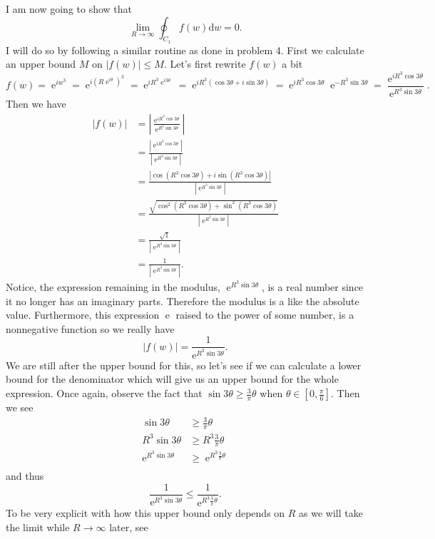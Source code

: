 \documentclass[10pt]{amsart}
\newcommand{\D}{\mathrm{d}}
\DeclareMathOperator{\E}{e}
\theoremstyle{nonumberplain}
\begin{document}
\begin{enumerate}[label={\bf {\arabic*}:}]
\noindent
I am now going to show that $$\lim_{R \rightarrow \infty} \oint_{C_{1}} f(w) \D w = 0.$$
I will do so by following a similar routine as done in problem 4.
First we calculate an upper bound $M$ on $\left| f(w) \right| \leq M$.
Let's first rewrite $f(w)$ a bit
$$
f(w) = \E^{iw^3} = \E^{i\left(R\E^{i\theta} \right)^3} = \E^{iR^3\E^{i3\theta}} = \E^{iR^3\left( \cos3\theta +  i\sin3\theta \right)} = \E^{iR^3\cos3\theta}\E^{ -R^3\sin3\theta} = \frac{\E^{iR^3\cos3\theta}}{\E^{R^3\sin3\theta}}.
$$
Then we have
\begin{align*}
\left|f(w)\right|
	&= \left| \frac{\E^{iR^3\cos3\theta}}{\E^{ R^3\sin3\theta}} \right| \\
	&= \frac{\left| \E^{iR^3\cos3\theta}\right| }{\left| \E^{ R^3\sin3\theta}\right| } \\
	&= \frac{\left| \cos\left(R^3\cos3\theta\right) + i\sin\left(R^3\cos3\theta\right)\right| }{\left| \E^{ R^3\sin3\theta}\right| } \\
	&= \frac{\sqrt{\cos^2\left(R^3\cos3\theta\right) + \sin^2\left(R^3\cos3\theta\right)} }{\left| \E^{ R^3\sin3\theta}\right| } \\
	&= \frac{\sqrt{1} }{\left| \E^{ R^3\sin3\theta}\right| } \\
	&= \frac{1}{\left| \E^{ R^3\sin3\theta}\right| }.
\end{align*}
Notice, the expression remaining in the modulus, $\E^{ R^3\sin3\theta}$, is a real number  since it no longer has an imaginary parts. Therefore the modulus is a like the absolute value.
Furthermore, this expression $\E$ raised to the power of some number, is a nonnegative function so we really have
$$
\left|f(w)\right| = \frac{1}{\E^{ R^3\sin3\theta}}.
$$
We are still after the upper bound for this, so let's see if we can calculate a lower bound for the denominator which will give us an upper bound for the whole expression.
Once again, observe the fact that
$\sin 3\theta \geq \frac 3 \pi \theta$ when $\theta \in [0, \frac \pi 6]$.
Then we see
\begin{align*}
\sin 3\theta &\geq \frac 3 \pi \theta \\
R^3\sin 3\theta &\geq R^3\frac 3 \pi \theta \\
\E^{R^3\sin 3\theta} &\geq \E^{R^3\frac 3 \pi \theta} \\
\end{align*}
and thus
$$
\frac 1 {\E^{R^3\sin 3\theta}} \leq \frac 1 {\E^{R^3\frac 3 \pi \theta}}.
$$
To be very explicit with how this upper bound only depends on $R$ as we will take the limit while $R\rightarrow \infty$ later, see

\end{enumerate}
\end{document}
